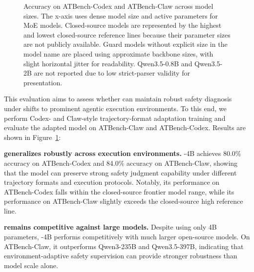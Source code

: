 \begin{figure}[ht]
\caption{Accuracy on ATBench-Codex and ATBench-Claw across model sizes. The x-axis uses dense model size and active parameters for MoE models. Closed-source models are represented by the highest and lowest closed-source reference lines because their parameter sizes are not publicly available. Guard models without explicit size in the model name are placed using approximate backbone sizes, with slight horizontal jitter for readability. Qwen3.5-0.8B and Qwen3.5-2B are not reported due to low strict-parser validity for presentation.}
\label{fig:atbench_size_acc}
\vspace{-5pt}
\end{figure}


This evaluation aims to assess whether \agentdog{} can maintain robust safety diagnosis under shifts to prominent agentic execution environments. To this end, we perform Codex- and Claw-style trajectory-format adaptation training and evaluate the adapted model on ATBench-Claw and ATBench-Codex. Results are shown in Figure~\ref{fig:atbench_size_acc}:

\textbf{\agentdog{} generalizes robustly across execution environments.}
    \agentdog{}-4B achieves 80.0\% accuracy on ATBench-Codex and 84.0\%
    accuracy on ATBench-Claw, showing that the model can preserve strong
    safety judgment capability under different trajectory formats and
    execution protocols. Notably, its performance on ATBench-Codex falls
    within the closed-source frontier model range, while its performance on
    ATBench-Claw slightly exceeds the closed-source high reference line.

\textbf{\agentdog{} remains competitive against large models.}
    Despite using only 4B parameters, \agentdog{}-4B performs competitively
    with much larger open-source models. On ATBench-Claw, it outperforms
    Qwen3-235B and Qwen3.5-397B, indicating that environment-adaptive safety
    supervision can provide stronger robustness than model scale alone.


